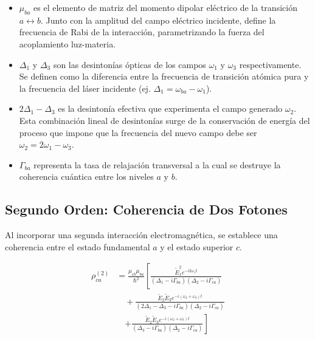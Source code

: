 \documentclass[12pt,a4paper]{article}
\begin{document}
\begin{itemize}
    \item $\mu_{ba}$ es el elemento de matriz del momento dipolar eléctrico de la transición $a \leftrightarrow b$. Junto con la amplitud del campo eléctrico incidente, define la frecuencia de Rabi de la interacción, parametrizando la fuerza del acoplamiento luz-materia.
    
    \item $\Delta_1$ y $\Delta_3$ son las desintonías ópticas de los campos $\omega_1$ y $\omega_3$ respectivamente. Se definen como la diferencia entre la frecuencia de transición atómica pura y la frecuencia del láser incidente (ej. $\Delta_1 = \omega_{ba} - \omega_1$). 
    
    \item $2\Delta_1 - \Delta_3$ es la desintonía efectiva que experimenta el campo generado $\omega_2$. Esta combinación lineal de desintonías surge de la conservación de energía del proceso que impone que la frecuencia del nuevo campo debe ser $\omega_2 = 2\omega_1 - \omega_3$.
    
    \item $\Gamma_{ba}$ representa la tasa de relajación transversal a la cual se destruye la coherencia cuántica entre los niveles $a$ y $b$.
\end{itemize}

\subsection*{Segundo Orden: Coherencia de Dos Fotones}

Al incorporar una segunda interacción electromagnética, se establece una coherencia entre el estado fundamental $a$ y el estado superior $c$.
 
\begin{equation}
\begin{aligned}
\rho_{ca}^{(2)} &= \frac{\mu_{cb}\mu_{ba}}{\hbar^2} \left[ \frac{\tilde{E}_1^2 e^{-i2\omega_1 t}}{(\Delta_1 - i\Gamma_{ba})(\Delta_2 - i\Gamma_{ca})} \right. \\
&\quad + \frac{\tilde{E}_2\tilde{E}_3 e^{-i(\omega_2+\omega_3)t}}{(2\Delta_1 - \Delta_3 - i\Gamma_{ba})(\Delta_2 - i\Gamma_{ca})} \\
&\quad \left. + \frac{\tilde{E}_2\tilde{E}_3 e^{-i(\omega_2+\omega_3)t}}{(\Delta_3 - i\Gamma_{ba})(\Delta_2 - i\Gamma_{ca})} \right]
\end{aligned} \tag{3}
\end{equation}
\end{document}
